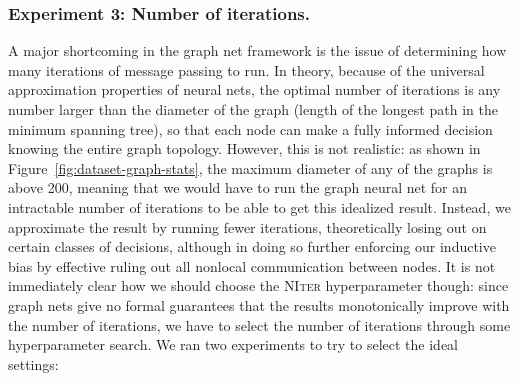 \subsubsection{Experiment 3: Number of iterations.}
A major shortcoming in the graph net framework is the issue of determining how many iterations of message passing to run.
In theory, because of the universal approximation properties of neural nets, the optimal number of iterations is any number larger than the diameter of the graph (length of the longest path in the minimum spanning tree), so that each node can make a fully informed decision knowing the entire graph topology.
However, this is not realistic: as shown in Figure~\ref{fig:dataset-graph-stats}, the maximum diameter of any of the graphs is above 200, meaning that we would have to run the graph neural net for an intractable number of iterations to be able to get this idealized result.
Instead, we approximate the result by running fewer iterations, theoretically losing out on certain classes of decisions, although in doing so further enforcing our inductive bias by effective ruling out all nonlocal communication between nodes.
It is not immediately clear how we should choose the \textsc{NIter} hyperparameter though: since graph nets give no formal guarantees that the results monotonically improve with the number of iterations, we have to select the number of iterations through some hyperparameter search.
We ran two experiments to try to select the ideal settings:
